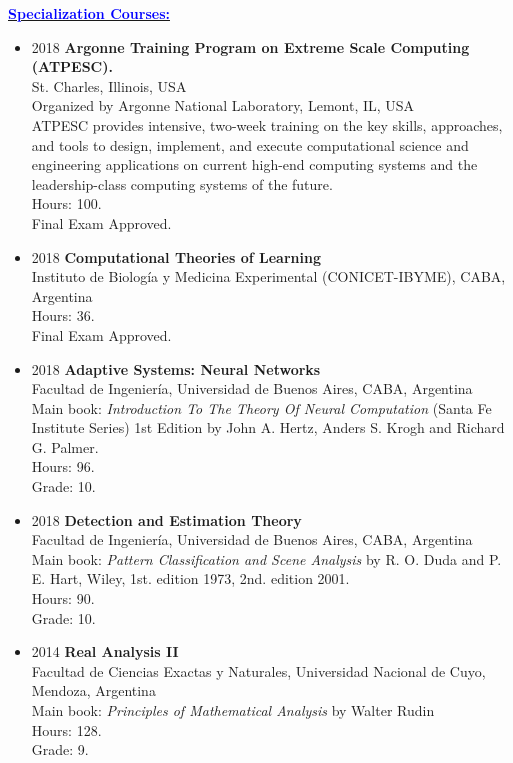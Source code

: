 \documentclass{article}
\newcommand{\statement}[1]{\par\medskip
  \underline{\textcolor{blue}{\textbf{#1:}}}\space
}
\begin{document}
\statement{Specialization Courses}
\begin{itemize}
	\item 2018 {\bf Argonne Training Program on Extreme Scale Computing (ATPESC).}\\
St. Charles, Illinois, USA\\
Organized by Argonne National Laboratory, Lemont, IL, USA\\
ATPESC provides intensive, two-week training on the key skills, approaches, and tools to design, implement, and execute computational science and engineering applications on current high-end computing systems and the leadership-class computing systems of the future.\\
Hours: 100.\\
Final Exam Approved.

	\item 2018 {\bf Computational Theories of Learning}\\
Instituto de Biología y Medicina Experimental (CONICET-IBYME), CABA, Argentina\\
Hours: 36.\\
Final Exam Approved.

	\item 2018 {\bf Adaptive Systems: Neural Networks}\\
Facultad de Ingeniería, Universidad de Buenos Aires, CABA, Argentina\\
Main book: {\it Introduction To The Theory Of Neural Computation} (Santa Fe Institute Series) 1st Edition by John A. Hertz, Anders S. Krogh and Richard G. Palmer.\\
Hours: 96.\\
Grade: 10.

	\item 2018 {\bf Detection and Estimation Theory}\\
Facultad de Ingeniería, Universidad de Buenos Aires, CABA, Argentina\\
Main book: {\it Pattern Classification and Scene Analysis} by R. O. Duda and P. E. Hart, Wiley, 1st. edition 1973, 2nd. edition 2001.\\
Hours: 90.\\
Grade: 10.

	\item 2014 {\bf Real Analysis II}\\
Facultad de Ciencias Exactas y Naturales, Universidad Nacional de Cuyo, Mendoza, Argentina\\
Main book: {\it Principles of Mathematical Analysis} by Walter Rudin\\
Hours: 128.\\
Grade: 9.


\end{itemize}
\end{document}
